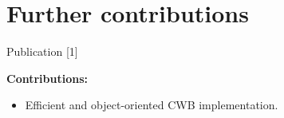 \documentclass[t,10pt]{beamer}
\begin{document}





\section{Further contributions}

\begin{frame}{Publication [1]}
  \vspace{-0.2cm}
  \begin{figure}
    \centering
  \end{figure}
  \vspace{-0.4cm}

  \textbf{Contributions:}
  \begin{itemize}
    \item
      Efficient and object-oriented CWB implementation.
  \end{itemize}
\end{frame}
\end{document}
